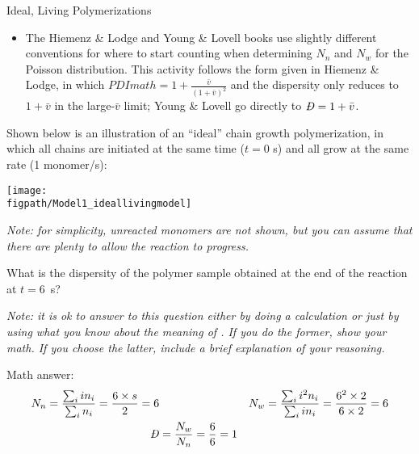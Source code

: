 \begin{activity}{Ideal, Living Polymerizations}
\begin{instructornotes}
\begin{itemize}
\begin{itemize}
				\item The Hiemenz \& Lodge and Young \& Lovell books use slightly different conventions for where to start counting when determining $N_n$ and $N_w$ for the Poisson distribution.  This activity follows the form given in Hiemenz \& Lodge, in which $PDImath = 1+\frac{\bar v}{(1+\bar v)^2}$ and the dispersity only reduces to $1 + \bar v$ in the large-$\bar v$ limit; Young \& Lovell go directly to $\PDImath = 1+\bar v$.
			\end{itemize}
	\end{itemize}
	
\end{instructornotes}


\begin{model}
	\label{\labelbase:mdl:idealliving}

	Shown below is an illustration of an ``ideal'' chain growth polymerization, in which all chains are initiated at the same time ($t=0$ s) and all grow at the same rate (1 monomer/s):
	    
	    \vspace{6pt}
	    	\centerline{\texttt{[image: \\figpath/Model1\_ideallivingmodel]}}
	    	
	    	\emph{Note: for simplicity, unreacted monomers are not shown, but you can assume that there are plenty to allow the reaction to progress.}
	
\end{model}


\begin{ctqs}

	\question What is the dispersity of the polymer sample obtained at the end of the reaction at $t=6$~s?
		
				\emph{Note: it is ok to answer to this question either by doing a calculation or just by using what you know about the meaning of \PDItext.  If you do the former, show your math. If you choose the latter, include a brief explanation of your reasoning.}
			
				\begin{solution}[1.25in]{}
				
					Math answer:
						\begin{align*}
							N_n = \frac{\sum_i i n_i}{\sum_i n_i} = \frac{6\times s}{2} = 6 &&&
							N_w = \frac{\sum_i i^2 n_i}{\sum_i i n_i} = \frac{6^2 \times 2}{6 \times 2} = 6\\
							\PDImath &= \frac{N_w}{N_n} = \frac{6}{6} = 1
						\end{align*}
					

\end{solution}
\end{ctqs}
\end{activity}
